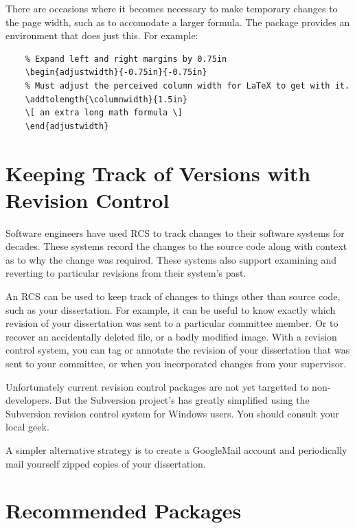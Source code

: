 There are occasions where it becomes necessary to make temporary
changes to the page width, such as to accomodate a larger formula. 
The  package provides an 
environment that does just this.  For example:
\begin{lstlisting}
    % Expand left and right margins by 0.75in
    \begin{adjustwidth}{-0.75in}{-0.75in}
    % Must adjust the perceived column width for LaTeX to get with it.
    \addtolength{\columnwidth}{1.5in}
    \[ an extra long math formula \]
    \end{adjustwidth}
\end{lstlisting}


\section{Keeping Track of Versions with Revision Control}
\label{sec:DissertationRevisionControl}

Software engineers have used \acf{RCS} to track changes to their
software systems for decades.  These systems record the changes to
the source code along with context as to why the change was required.
These systems also support examining and reverting to particular
revisions from their system's past.

An \ac{RCS} can be used to keep track of changes to things other
than source code, such as your dissertation.  For example, it can
be useful to know exactly which revision of your dissertation was
sent to a particular committee member.  Or to recover an accidentally
deleted file, or a badly modified image.  With a revision control
system, you can tag or annotate the revision of your dissertation
that was sent to your committee, or when you incorporated changes
from your supervisor.

Unfortunately current revision control packages are not yet targetted
to non-developers.  But the Subversion project's
has greatly simplified using the Subversion revision control system
for Windows users.  You should consult your local geek.

A simpler alternative strategy is to create a GoogleMail account
and periodically mail yourself zipped copies of your dissertation.

\section{Recommended Packages}

